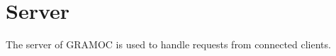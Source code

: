 \chapter{Server}
\label{ch:server}

The server of GRAMOC is used to handle requests from connected clients.
